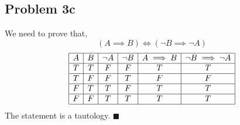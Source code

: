 \documentclass[answers]{exam}
\theoremstyle{mytheoremstyle}
\theoremstyle{mytheoremstyle}
\theoremstyle{myproblemstyle}
\begin{document}
\subsection*{Problem 3c}
\begin{framed}
    We need to prove that,
    \[(A\implies B) \iff (\lnot B\implies\lnot A)\]
    \begin{displaymath}
        \begin{array}{|c|c|c|c|c|c|}
            \hline
            A & B & \lnot A & \lnot B & A\implies B & \lnot B\implies \lnot A \\\hline
            T & T & F       & F       & T           & T                       \\\hline
            T & F & F       & T       & F           & F                       \\\hline
            F & T & T       & F       & T           & T                       \\\hline
            F & F & T       & T       & T           & T                       \\\hline
        \end{array}
    \end{displaymath}
    The statement is a tautology. \(\blacksquare\)
\end{framed}
\end{document}

